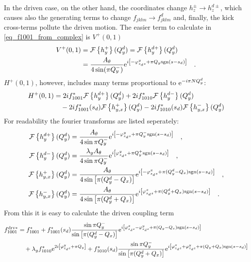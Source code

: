 %
In the driven case, on the other hand, the coordinates change $h_z^\pm \rightarrow h_z^{d\pm}$, which
causes also the generating terms to change $f_{jklm} \rightarrow f^d_{jklm}$ and, finally, the kick
cross-terms pollute the driven motion.
The easier term to calculate in \eqref{eq_f1001_from_complex} is $V^+(0,1)$
%
\begin{align}
    V^+(0,1) &= \mathcal{F} \left\{ h_y^+ \right\}(Q_y^d) = \mathcal{F} \left\{ h_y^{d+} \right\}(Q_y^d)
    \notag \\
    &= \frac{A_\theta}{4\sin(\pi Q_y^-)}
        \text{e}^{i\left[-\varphi_{s_ds}^{y} + \pi Q_y\text{sgn}(s-s_d)\right]}
        \quad .
\end{align}
%
$H^+(0,1)$, however, includes many terms proportional to $\text{e}^{-i\pi N Q_y^d}$:
%
\begin{align}
   H^+(0,1) &=
    2i f_{1001}^*      \mathcal{F} \left\{ h_y^{d+} \right\}(Q_y^d)
   +2i f_{1010}^*      \mathcal{F} \left\{ h_y^{d-} \right\}(Q_y^d)
   \notag \\&\quad
   -2i f_{1001}^*(s_d) \mathcal{F} \left\{ h_{y,x}^{+} \right\}(Q_y^d)
   -2i f_{1010}^*(s_d) \mathcal{F} \left\{ h_{y,x}^{-} \right\}(Q_y^d)
\end{align}
%
For readability the fourier transforms are listed seperately:
%
\begin{align}
    \mathcal{F} \left\{ h_y^{d+} \right\}(Q_y^d) &= \frac{A_\theta}{4\sin\pi Q_y^-}
        \text{e}^{i\left[-\varphi_{s_ds}^{y} + \pi Q_y^-\text{sgn}(s-s_d)\right]}
    \quad ,
    \notag \\
    \mathcal{F} \left\{ h_y^{d-} \right\}(Q_y^d) &= \frac{\lambda_y A_\theta}{4\sin\pi Q_y^-}
        \text{e}^{i\left[\varphi_{s_ds}^{y} + \pi Q_y^+\text{sgn}(s-s_d)\right]}
    \quad ,
    \notag \\
    \mathcal{F} \left\{ h_{y,x}^{+} \right\}(Q_y^d) &= \frac{A_\theta}{4\sin\left[\pi (Q_y^d - Q_x)\right]}
        \text{e}^{i\left[-\varphi_{s_ds}^{x} + \pi (Q_y^d - Q_x)\text{sgn}(s-s_d)\right]}
    \quad ,
    \notag \\
    \mathcal{F} \left\{ h_{y,x}^{-} \right\}(Q_y^d) &= \frac{A_\theta}{4\sin\left[\pi (Q_y^d + Q_x)\right]}
        \text{e}^{i\left[\varphi_{s_ds}^{x} + \pi (Q_y^d + Q_x)\text{sgn}(s-s_d)\right]}
    \quad .
\end{align}
%
From this it is easy to calculate the driven coupling term 
%
\begin{align}
    f_{1001}^{\text{drv}*} &=
    f_{1001}^*
    + f_{1001}^*(s_d) \frac{\sin\pi Q_y^-}{\sin\left[\pi (Q_y^d-Q_x)\right]}
        \text{e}^{i\left[\varphi_{s_ds}^{x} -\varphi_{s_ds}^{y} + \pi(Q_y-Q_x)\text{sgn}(s-s_d)\right]}
        \notag \\
    &\quad
    + \lambda_y f_{1010}^*\text{e}^{2i\left[ \varphi_{s_ds}^{y} + \pi Q_y\right]}
    + f_{1010}^*(s_d) \frac{\sin\pi Q_y^-}{\sin\left[\pi (Q_y^d+Q_x)\right]}
        \text{e}^{i\left[\varphi_{s_ds}^{x} + \varphi_{s_ds}^{y} + \pi(Q_y+Q_x)\text{sgn}(s-s_d)\right]}
    \label{eq_drv_f1001_final}
\end{align}

